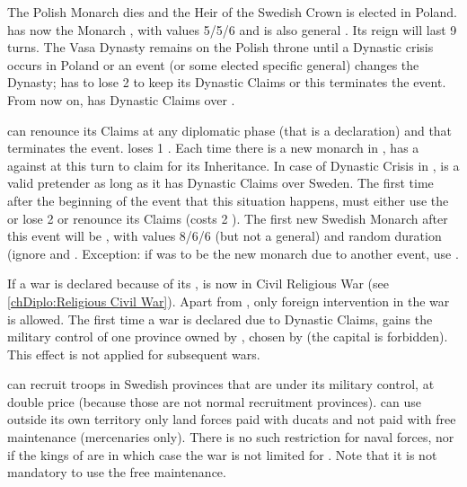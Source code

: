 \phevnt
\aparag The Polish Monarch dies and the Heir of the Swedish Crown is elected
in Poland. \POL has now the Monarch , with values 5/5/6
and is also general . Its reign will last 9 turns.
\aparag The Vasa Dynasty remains on the Polish throne until a Dynastic crisis
occurs in Poland or an event (or some elected specific general) changes the
Dynasty; \POL has to lose 2 \STAB to keep its Dynastic Claims or this
terminates the event.  From now on, \POL has Dynastic Claims over \SUE.

\effetlong
\aparag \POL can renounce its Claims at any diplomatic phase (that is a
declaration) and that terminates the event. \POL loses 1 \STAB.
\aparag Each time there is a new monarch in \SUE, \POL has a \CB against \SUE
at this turn to claim for its Inheritance. In case of Dynastic Crisis in \SUE,
\POL is a valid pretender as long as it has Dynastic Claims over Sweden.
\bparag The first time after the beginning of the event that this situation
happens, \POL must either use the \CB or lose 2 \STAB or renounce its Claims
(costs 2 \STAB).
\aparag The first new Swedish Monarch after this event will be
, with values 8/6/6 (but not a general) and random
duration (ignore  and .
Exception: if  was to be the new monarch due to
another event, use .

\phdipl
\aparag If a war is declared because of its \CB, \SUE is now in Civil
Religious War (see \ref{chDiplo:Religious Civil War}). Apart from \POL, only
foreign intervention in the war is allowed.
\aparag The first time a war is declared due to Dynastic Claims, \POL gains
the military control of one province owned by \SUE, chosen by \POL (the
capital is forbidden). This effect is not applied for subsequent wars.

\phadm
\aparag \POL can recruit troops in Swedish provinces that are under its
military control, at double price (because those are not normal recruitment
provinces).
\aparag \POL can use outside its own territory only land forces paid with
ducats and not paid with free maintenance (mercenaries only). There is no such
restriction for naval forces, nor if the kings of \SUE are \PROTRIG in which
case the war is not limited for \POL. Note that it is not mandatory to use the
free maintenance.

